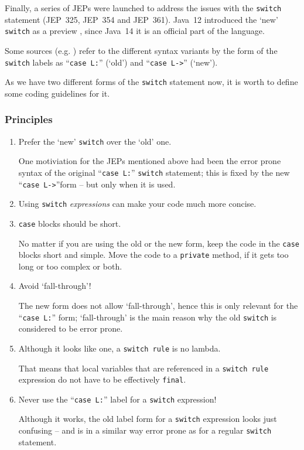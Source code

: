 Finally, a series of JEPs were launched to address the issues with the \lstinline|switch| statement (JEP~325\autocite{JEP325}, JEP~354\autocite{JEP354} and JEP~361\autocite{JEP361}). Java~12 introduced the ‘new’ \lstinline|switch| as a preview \autocite{JEP325:Specification}, since Java~14 it is an official part of the language.

Some sources (e.g. \autocite{ORACLE_DOC_SWITCHEXPRESSIONS}) refer to the different syntax variants by the form of the \lstinline|switch| labels as ``\verb#case L:#'' (‘old’) and ``\verb#case L->#'' (‘new’). 



As we have two different forms of the \lstinline|switch| statement now, it is worth to define some coding guidelines for it.


\subsubsection{Principles}
\begin{enumerate}[label=P\arabic*.]
\item{Prefer the ‘new’ \lstinline|switch| over the ‘old’ one.

One motiviation for the JEPs mentioned above had been the error prone syntax of the original “\verb#case L:#” \lstinline|switch| statement; this is fixed by the new “\verb#case L->#”form – but only when it is used.}

\item{Using \lstinline|switch| \textit{expressions} can make your code much more concise.}

\item{\lstinline|case| blocks should be short.

No matter if you are using the old or the new form, keep the code in the \lstinline|case| blocks short and simple. Move the code to a \lstinline|private| method, if it gets too long or too complex or both.}

\item{Avoid ‘fall-through’!

The new form does not allow ‘fall-through’, hence this is only relevant for the “\verb#case L:#” form; ‘fall-through’ is the main reason why the old \lstinline|switch| is considered to be error prone.}

\item{Although it looks like one, a \verb#switch rule# is no lambda.

That means that local variables that are referenced in a \verb#switch rule# expression do not have to be effectively \lstinline|final|.}

\item{Never use the “\verb#case L:#” label for a \lstinline|switch| expression!

Although it works, the old label form for a \lstinline|switch| expression looks just confusing – and is in a similar way error prone as for a regular \lstinline|switch| statement.}
\end{enumerate}

